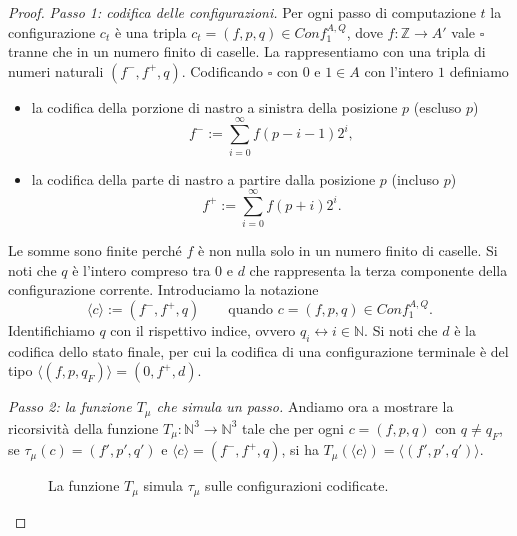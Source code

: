 \begin{proof}
\medskip
\noindent\emph{Passo 1: codifica delle configurazioni.}
Per ogni passo di computazione $t$ la configurazione $c_t$ è una tripla $c_t=(f,p,q)\in Conf_1^{A,Q}$, dove $f\colon\mathbb Z\to A'$ vale $\square$ tranne che in un numero finito di caselle. La rappresentiamo con una tripla di numeri naturali $(f^-,f^+,q)$. Codificando $\square$ con $0$ e $1\in A$ con l'intero $1$ definiamo
\begin{itemize}
\item la codifica della porzione di nastro a sinistra della posizione $p$ (escluso $p$)
\[
f^-:=\sum_{i=0}^{\infty}f(p-i-1)2^i,
\]
\item la codifica della parte di nastro a partire dalla posizione $p$ (incluso $p$)
\[
f^+:=\sum_{i=0}^{\infty}f(p+i)2^i.
\]
\end{itemize}
Le somme sono finite perché $f$ è non nulla solo in un numero finito di caselle. Si noti che $q$ è l'intero compreso tra $0$ e $d$ che rappresenta la terza componente della configurazione corrente. Introduciamo la notazione
\[
\langle c\rangle:=(f^-,f^+,q)\qquad\text{quando } c=(f,p,q)\in Conf_1^{A,Q}.
\]
Identifichiamo $q$ con il rispettivo indice, ovvero $q_i\leftrightarrow i\in\mathbb N$. Si noti che $d$ è la codifica dello stato finale, per cui la codifica di una configurazione terminale è del tipo $\langle(f,p,q_F)\rangle=(0,f^+,d)$.

\medskip
\noindent\emph{Passo 2: la funzione $T_\mu$ che simula un passo.}
Andiamo ora a mostrare la ricorsività della funzione $T_\mu\colon\mathbb N^3\to\mathbb N^3$ tale che per ogni $c=(f,p,q)$ con $q\neq q_F$, se $\tau_\mu(c)=(f',p',q')$ e $\langle c\rangle=(f^-,f^+,q)$, si ha $T_\mu(\langle c\rangle)=\langle(f',p',q')\rangle$.

\begin{figure}[H]
\centering
{}
\caption{La funzione $T_\mu$ simula $\tau_\mu$ sulle configurazioni codificate.}
\label{fig:tmu}
\end{figure}


\end{proof}

